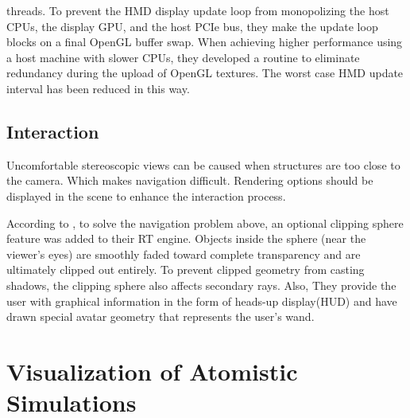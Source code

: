 \documentclass[10pt,twocolumn,letterpaper]{article}
\begin{document}
threads. To prevent the HMD display update loop from monopolizing the host CPUs, the display GPU, and the host PCIe bus, they make the update loop blocks on a final OpenGL buffer swap. When achieving higher performance using a host machine with slower CPUs, they developed a routine to eliminate redundancy during the upload of OpenGL textures. The worst case HMD update interval has been reduced in this way.

\subsection{Interaction}
Uncomfortable stereoscopic views can be caused when structures are too close to the camera. Which makes navigation difficult. Rendering options should be displayed in the scene to enhance the interaction process.

According to \cite{stone_immersive_2016}, to solve the navigation problem above, an optional clipping sphere feature was added to their RT engine. Objects inside the sphere (near the viewer’s eyes) are smoothly faded toward complete transparency and are ultimately clipped out entirely. To prevent clipped geometry from casting shadows, the clipping sphere also affects secondary rays. Also, They provide the user with graphical information in the form of heads-up display(HUD) and have drawn special avatar geometry that represents the user’s wand.

\section{Visualization of Atomistic Simulations}
\end{document}
